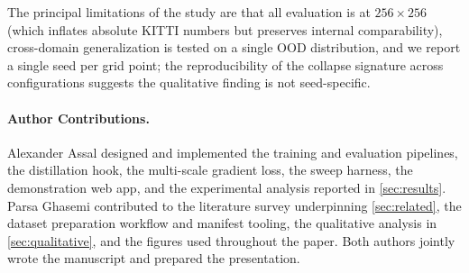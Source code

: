 \documentclass[10pt,twocolumn,letterpaper]{article}
\begin{document}
The principal limitations of the study are that all evaluation is at
$256{\times}256$ (which inflates absolute KITTI numbers but preserves
internal comparability), cross-domain generalization is tested on a
single OOD distribution, and we report a single seed per grid point;
the reproducibility of the collapse signature across configurations
suggests the qualitative finding is not seed-specific.

\paragraph{Author Contributions.} Alexander Assal designed and
implemented the training and evaluation pipelines, the distillation
hook, the multi-scale gradient loss, the sweep harness, the
demonstration web app, and the experimental analysis reported in
\cref{sec:results}. Parsa Ghasemi contributed to the literature survey
underpinning \cref{sec:related}, the dataset preparation workflow and
manifest tooling, the qualitative analysis in \cref{sec:qualitative},
and the figures used throughout the paper. Both authors jointly wrote
the manuscript and prepared the presentation.

{
    \small
    
    
}
\end{document}

